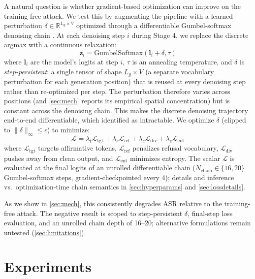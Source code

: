 \documentclass{article}
\theoremstyle{coloredthm}
\begin{document}
A natural question is whether gradient-based optimization can improve on the training-free attack. We test this by augmenting the pipeline with a learned perturbation $\delta \in \mathbb{R}^{L_g \times V}$ optimized through a differentiable Gumbel-softmax denoising chain \citep{jang2017gumbel, maddison2017concrete}. At each denoising step $i$ during Stage 4, we replace the discrete argmax with a continuous relaxation:
\begin{equation}
    \mathbf{z}_i = \text{GumbelSoftmax}(\mathbf{l}_i + \delta, \tau)
\end{equation}
where $\mathbf{l}_i$ are the model's logits at step $i$, $\tau$ is an annealing temperature, and $\delta$ is \emph{step-persistent}: a single tensor of shape $L_g \times V$ (a separate vocabulary perturbation for each generation position) that is reused at every denoising step rather than re-optimized per step. The perturbation therefore varies across positions (and \cref{sec:mech} reports its empirical spatial concentration) but is constant across the denoising chain. This makes the discrete denoising trajectory end-to-end differentiable, which \citet{yamabe2026priming} identified as intractable. We optimize $\delta$ (clipped to $\|\delta\|_\infty \leq \epsilon$) to minimize:
\begin{equation}
    \mathcal{L} = \lambda_t \mathcal{L}_{\text{tgt}} + \lambda_r \mathcal{L}_{\text{ref}} + \lambda_c \mathcal{L}_{\text{div}} + \lambda_e \mathcal{L}_{\text{ent}}
    \label{eq:loss}
\end{equation}
where $\mathcal{L}_{\text{tgt}}$ targets affirmative tokens, $\mathcal{L}_{\text{ref}}$ penalizes refusal vocabulary, $\mathcal{L}_{\text{div}}$ pushes away from clean output, and $\mathcal{L}_{\text{ent}}$ minimizes entropy. The scalar $\mathcal{L}$ is evaluated at the final logits of an unrolled differentiable chain ($N_{\text{chain}}{\in}\{16,20\}$ Gumbel-softmax steps, gradient-checkpointed every 4); details and inference vs.\ optimization-time chain semantics in \cref{sec:hyperparams} and \cref{sec:lossdetails}.

As we show in \cref{sec:mech}, this consistently degrades ASR relative to the training-free attack. The negative result is scoped to step-persistent $\delta$, final-step loss evaluation, and an unrolled chain depth of 16--20; alternative formulations remain untested (\cref{sec:limitations}).

\section{Experiments}
\label{sec:experiments}
\end{document}
